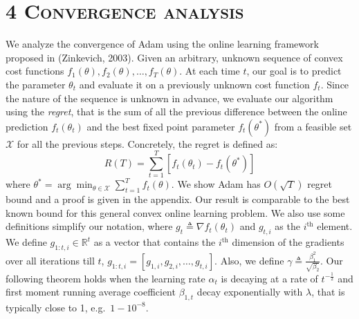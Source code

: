 \documentclass[11pt]{article}
\begin{document}

\newpage

\setcounter{equation}{4}

\section*{4 \textsc{Convergence analysis}}

We analyze the convergence of Adam using the online learning
framework proposed in (Zinkevich, 2003). Given an arbitrary,
unknown sequence of convex cost functions
$f_1(\theta), f_2(\theta), \ldots, f_T(\theta)$. At each time $t$,
our goal is to predict the parameter $\theta_t$ and evaluate it on
a previously unknown cost function $f_t$. Since the nature of the
sequence is unknown in advance, we evaluate our algorithm using
the \emph{regret}, that is the sum of all the previous difference
between the online prediction $f_t(\theta_t)$ and the best fixed
point parameter $f_t(\theta^*)$ from a feasible set $\mathcal{X}$
for all the previous steps. Concretely, the regret is defined as:
%
\begin{equation}
R(T) = \sum_{t=1}^{T} [f_t(\theta_t) - f_t(\theta^*)]
\end{equation}
%
where $\theta^* = \arg\min_{\theta \in \mathcal{X}} \sum_{t=1}^{T} f_t(\theta)$.
We show Adam has $O(\sqrt{T})$ regret bound and a proof is given
in the appendix. Our result is comparable to the best known bound
for this general convex online learning problem. We also use some
definitions simplify our notation, where
$g_t \triangleq \nabla f_t(\theta_t)$ and $g_{t,i}$ as the
$i^\text{th}$ element. We define
$g_{1:t,i} \in \mathbb{R}^t$ as a vector that contains the
$i^\text{th}$ dimension of the gradients over all iterations till
$t$, $g_{1:t,i} = [g_{1,i}, g_{2,i}, \ldots, g_{t,i}]$. Also, we
define $\gamma \triangleq \frac{\beta_1^2}{\sqrt{\beta_2}}$. Our
following theorem holds when the learning rate $\alpha_t$ is
decaying at a rate of $t^{-\frac{1}{2}}$ and first moment running
average coefficient $\beta_{1,t}$ decay exponentially with
$\lambda$, that is typically close to 1, e.g.\
$1 - 10^{-8}$.

\vspace{0.5em}
\end{document}
